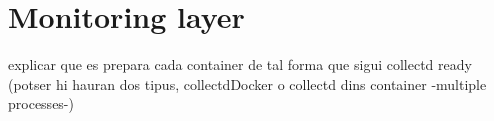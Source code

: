 \chapter{Monitoring layer}\label{G:monitoringLayer}
explicar que es prepara cada container de tal forma que sigui collectd ready (potser hi hauran dos tipus, collectdDocker o collectd dins container -multiple processes-)